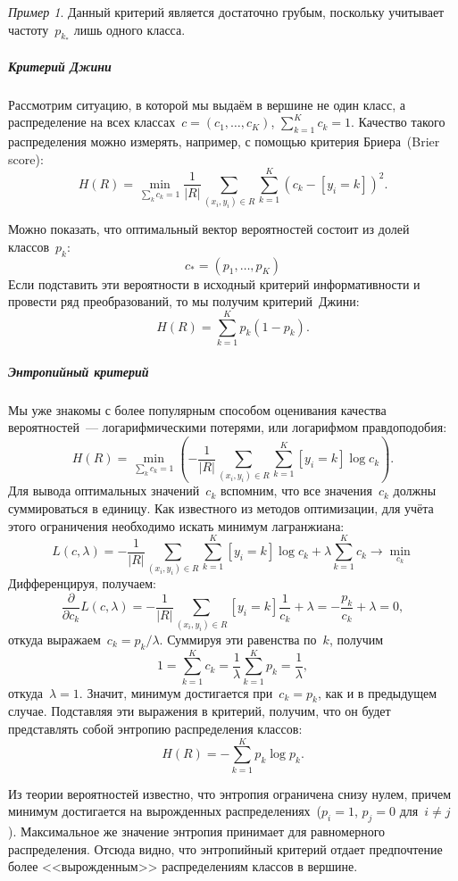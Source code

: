 \documentclass[a4paper, 12pt]{article}
\theoremstyle{plain} %
\theoremstyle{definition} %
\theoremstyle{remark} %
\newtheorem{example}{Пример}
\begin{document}
\begin{example}
Данный критерий является достаточно грубым,
поскольку учитывает частоту~$p_{k_*}$ лишь одного класса.

\subparagraph{Критерий Джини}
Рассмотрим ситуацию, в которой мы выдаём в вершине не один класс,
а распределение на всех классах~$c = (c_1, \dots, c_K)$, $\sum_{k = 1}^{K} c_k = 1$.
Качество такого распределения можно измерять, например, с помощью критерия Бриера~(Brier score):
\[
    H(R)
    =
    \min_{\sum_k c_k = 1}
    \frac{1}{|R|}
    \sum_{(x_i, y_i) \in R}
    \sum_{k = 1}^{K}
        (c_k - [y_i = k])^2.
\]

Можно показать, что оптимальный вектор вероятностей состоит из долей классов~$p_k$:
\[
    c_* = (p_1, \dots, p_K)
\]
Если подставить эти вероятности в исходный критерий информативности
и провести ряд преобразований, то мы получим критерий~Джини:
\[
    H(R)
    =
    \sum_{k = 1}^{K}
        p_k (1 - p_k).
\]

\subparagraph{Энтропийный критерий}
Мы уже знакомы с более популярным способом оценивания качества
вероятностей~--- логарифмическими потерями, или логарифмом правдоподобия:
\[
    H(R)
    =
    \min_{\sum_k c_k = 1} \left(
        -
        \frac{1}{|R|}
        \sum_{(x_i, y_i) \in R}
        \sum_{k = 1}^{K}
            [y_i = k]
            \log c_k
    \right).
\]
Для вывода оптимальных значений~$c_k$ вспомним, что все значения~$c_k$
должны суммироваться в единицу.
Как известного из методов оптимизации, для учёта этого ограничения необходимо искать
минимум лагранжиана:
\[
    L(c, \lambda)
    =
    -
    \frac{1}{|R|}
    \sum_{(x_i, y_i) \in R}
    \sum_{k = 1}^{K}
        [y_i = k]
        \log c_k
    +
    \lambda
    \sum_{k = 1}^{K}
        c_k
    \to
    \min_{c_k}
\]
Дифференцируя, получаем:
\[
    \frac{\partial}{\partial c_k}
    L(c, \lambda)
    =
    -
    \frac{1}{|R|}
    \sum_{(x_i, y_i) \in R}
        [y_i = k]
        \frac{1}{c_k}
    +
    \lambda
    =
    - \frac{p_k}{c_k}
    +
    \lambda
    =
    0,
\]
откуда выражаем~$c_k = p_k / \lambda$.
Суммируя эти равенства по~$k$, получим
\[
    1 = \sum_{k = 1}^{K} c_k = \frac{1}{\lambda} \sum_{k = 1}^{K} p_k = \frac{1}{\lambda},
\]
откуда~$\lambda = 1$.
Значит, минимум достигается при~$c_k = p_k$, как и в предыдущем случае.
Подставляя эти выражения в критерий, получим, что он будет представлять собой энтропию распределения классов:
\[
    H(R)
    =
    -
    \sum_{k = 1}^{K}
        p_k
        \log p_k.
\]

Из теории вероятностей известно, что энтропия ограничена снизу нулем, причем минимум достигается на вырожденных
распределениях~($p_i = 1$, $p_j = 0$ для~$i \neq j$).
Максимальное же значение энтропия принимает для равномерного распределения.
Отсюда видно, что энтропийный критерий отдает предпочтение более <<вырожденным>> распределениям классов
в вершине.


\end{example}
\end{document}
